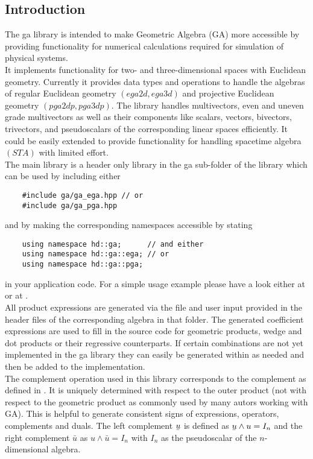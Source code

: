 \subsection{Introduction}
\label{intro}

The ga library is intended to make Geometric Algebra (GA) more accessible by providing
functionality for numerical calculations required for simulation of physical systems. \\

It implements functionality for two- and three-dimensional spaces with Euclidean geometry.
Currently it provides data types and operations to handle the algebras of regular
Euclidean geometry $(ega2d, ega3d)$ and projective Euclidean geometry $(pga2dp, pga3dp)$.
The library handles multivectors, even and uneven grade multivectors as well as their
components like scalars, vectors, bivectors, trivectors, and pseudoscalars of the
corresponding linear spaces efficiently. It could be easily extended to provide
functionality for handling spacetime algebra $(STA)$ with limited effort. \\

The main library is a header only library in the ga sub-folder of the library which can be
used by including either
\begin{verbatim}
    #include ga/ga_ega.hpp // or
    #include ga/ga_pga.hpp
\end{verbatim}
and by making the corresponding namespaces accessible by stating
\begin{verbatim}
    using namespace hd::ga;      // and either
    using namespace hd::ga::ega; // or
    using namespace hd::ga::pga;
\end{verbatim}
in your application code. For a simple usage example please have a look either at
 or at .
\\

All product expressions are generated via the file  and
user input provided in the header files of the corresponding algebra in that folder. The
generated coefficient expressions are used to fill in the source code for geometric
products, wedge and dot products or their regressive counterparts. If certain combinations
are not yet implemented in the ga library they can easily be generated within
 as needed and then be added to the implementation. \\

The complement operation used in this library corresponds to the complement as defined in
\cite{Lengyel_pga-illuminated:2024}. It is uniquely determined with respect to the outer
product (not with respect to the geometric product as commonly used by many autors working
with GA). This is helpful to generate consistent signs of expressions, operators,
complements and duals. The left complement $\ubar{u}$ is defined as $\ubar{u} \wedge u =
I_n$ and the right complement $\bar{u}$ as $u \wedge \bar{u} = I_n$ with $I_n$ as the
pseudoscalar of the $n$-dimensional algebra. \\

